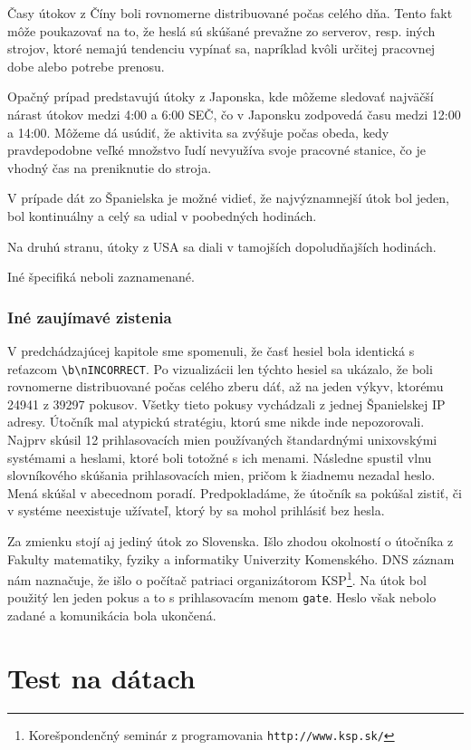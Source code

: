 \documentclass[12pt, oneside]{book}
\begin{document}
Časy útokov z Číny boli rovnomerne distribuované počas celého dňa. Tento fakt môže poukazovať na to, že heslá sú skúšané prevažne zo serverov, resp. iných strojov, ktoré nemajú tendenciu vypínať sa, napríklad kvôli určitej pracovnej dobe alebo potrebe prenosu.

Opačný prípad predstavujú útoky z Japonska, kde môžeme sledovať najväčší nárast útokov medzi 4:00 a 6:00 SEČ, čo v Japonsku zodpovedá času medzi 12:00 a 14:00.
Môžeme dá usúdiť, že aktivita sa zvýšuje počas obeda, kedy pravdepodobne veľké množstvo ľudí nevyužíva svoje pracovné stanice, čo je vhodný čas na preniknutie do stroja.

V prípade dát zo Španielska je možné vidieť, že najvýznamnejší útok bol jeden, bol kontinuálny a celý sa udial v poobedných hodinách.

Na druhú stranu, útoky z USA sa diali v tamojších dopoludňajších hodinách.

Iné špecifiká neboli zaznamenané.

\subsection{Iné zaujímavé zistenia}

V predchádzajúcej kapitole sme spomenuli, že časť hesiel bola identická s reťazcom \texttt{\textbackslash b\textbackslash nINCORRECT}.
Po vizualizácii len týchto hesiel sa ukázalo, že boli rovnomerne distribuované počas celého zberu dáť, až na jeden výkyv, ktorému 24941 z 39297 pokusov.
Všetky tieto pokusy vychádzali z jednej Španielskej IP adresy.
Útočník mal atypickú stratégiu, ktorú sme nikde inde nepozorovali.
Najprv skúsil 12 prihlasovacích mien používaných štandardnými unixovskými systémami a heslami, ktoré boli totožné s ich menami.
Nás\-led\-ne spustil vlnu slovníkového skúšania prihlasovacích mien, pričom k žiad\-ne\-mu nezadal heslo.
Mená skúšal v abecednom poradí.
Predpokladáme, že útočník sa pokúšal zistiť, či v systéme neexistuje užívateľ, ktorý by sa mohol prihlásiť bez hesla.

Za zmienku stojí aj jediný útok zo Slovenska.
Išlo zhodou okolností o útočníka z Fakulty matematiky, fyziky a informatiky Univerzity Komenského.
DNS záznam nám naznačuje, že išlo o počítač patriaci organizátorom KSP\footnote{Korešpondenčný seminár z programovania \texttt{http://www.ksp.sk/}}.
Na útok bol použitý len jeden pokus a to s prihlasovacím menom \texttt{gate}.
Heslo však nebolo zadané a komunikácia bola ukončená.

\chapter{Test na dátach}
\end{document}
